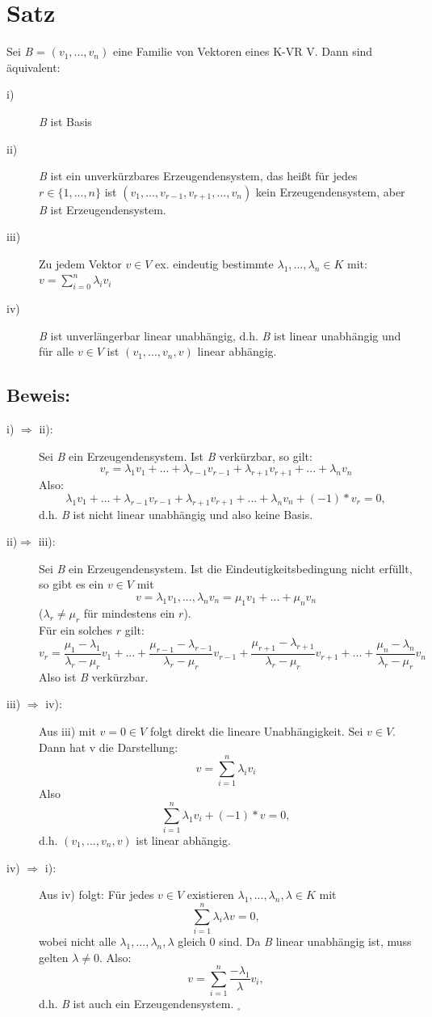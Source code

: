 \documentclass{scrbook}
\begin{document}
\section{Satz}
Sei \textit{B} = $(v_1,...,v_n)$ eine Familie von Vektoren eines K-VR V. Dann sind äquivalent:
\begin{description}
\item[i)] \textit{B} ist Basis
\item[ii)] \textit{B} ist ein unverkürzbares Erzeugendensystem, das heißt für jedes $r\in \{1,...,n\}$ ist $(v_1,...,v_{r-1},v_{r+1},...,v_n)$ kein Erzeugendensystem, aber \textit{B} ist Erzeugendensystem.
\item[iii)] Zu jedem Vektor $v\in V$ ex. eindeutig bestimmte $\lambda_1,...,\lambda_n \in K$ mit: $v=\sum^n_{i=0}\lambda_iv_i$
\item[iv)] \textit{B} ist unverlängerbar linear unabhängig, d.h. \textit{B} ist linear unabhängig und für alle $v \in V$ ist $(v_1,...,v_n,v)$ linear abhängig.
\end{description}
\subsection*{Beweis:}
\begin{description}
\item[i) $\Rightarrow$ ii):] Sei \textit{B} ein Erzeugendensystem. Ist \textit{B} verkürzbar, so gilt:
\[
v_r = \lambda_1 v_1+...+\lambda_{r-1} v_{r-1}+\lambda_{r+1} v_{r+1}+...+\lambda_nv_n
\] 
Also:
\[
\lambda_1 v_1+...+\lambda_{r-1} v_{r-1}+\lambda_{r+1} v_{r+1}+...+\lambda_nv_n+(-1)*v_r=0,
\] d.h. \textit{B} ist nicht linear unabhängig und also keine Basis.
\item[ii)$\Rightarrow$ iii):] Sei \textit{B} ein Erzeugendensystem. Ist die Eindeutigkeitsbedingung nicht erfüllt, so gibt es ein $v \in V$ mit 
\[
v=\lambda_1v_1,...,\lambda_nv_n=\mu_1v_1+...+\mu_nv_n
\]
($\lambda_r\neq \mu_r$ für mindestens ein $r$).\\
Für ein solches $r$ gilt:
\[
v_r=\dfrac{\mu_1-\lambda_1}{\lambda_r-\mu_r}v_1+...+\dfrac{\mu_{r-1}-\lambda_{r-1}}{\lambda_r-\mu_r}v_{r-1}+\dfrac{\mu_{r+1}-\lambda_{r+1}}{\lambda_r-\mu_r}v_{r+1}+...+\dfrac{\mu_n-\lambda_n}{\lambda_r-\mu_r}v_n
\]
Also ist \textit{B} verkürzbar.
\item[iii) $\Rightarrow$ iv):] Aus iii) mit $v=0\in V$ folgt direkt die lineare Unabhängigkeit. Sei $v\in V $. Dann hat v die Darstellung:
\[
v=\sum^n_{i=1}\lambda_iv_i
\]
Also
\[
\sum^n_{i=1}\lambda_1v_i +(-1)*v = 0,
\]
d.h. $(v_1,...,v_n,v)$ ist linear abhängig.
\item[iv) $\Rightarrow$ i):] Aus iv) folgt: Für jedes $v\in V$ existieren $\lambda_1,...,\lambda_n,\lambda \in K$ mit \[
\sum^n_{i=1}\lambda_i\lambda v = 0,
\]
wobei nicht alle $\lambda_1,...,\lambda_n, \lambda$ gleich 0 sind. Da \textit{B} linear unabhängig ist, muss gelten $\lambda\neq 0$. Also:
\[
v=\sum^n_{i=1}\dfrac{-\lambda_1}{\lambda}v_i,
\]
d.h. \textit{B} ist auch ein Erzeugendensystem. $_\square$
\end{description}
\end{document}
